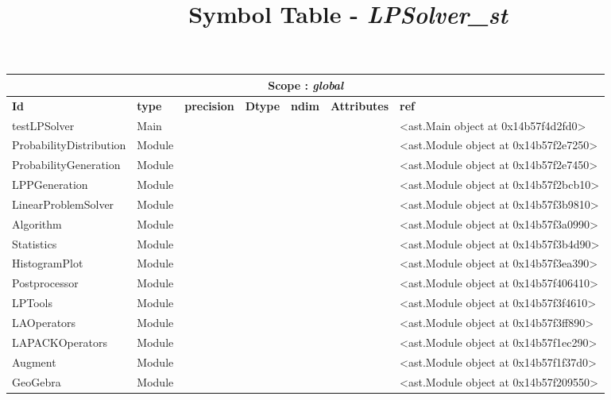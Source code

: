 \documentclass{report}
\title{\bfseries Symbol Table - \textit{LPSolver\_st}}
\begin{document}
\maketitle\pagebreak

\renewcommand{\arraystretch}{1.5}
\addtolength{\textwidth}{3cm}


\begin{center}
\begin{longtable}{|p{3.5cm}|p{1.5cm}|p{1.5cm}|p{1.5cm}|p{1cm}|p{2cm}|p{4cm}| }
\hline
\multicolumn{7}{|c|}{\textbf{Scope : }  \textbf{\textit{global}}} \\ 
\hline
\textbf{Id} & \textbf{type} & \textbf{precision} & \textbf{Dtype} & \textbf{ndim} & \textbf{Attributes} & \textbf{ref} \\\hline

testLPSolver & Main &  &  &  &  & <ast.Main object at 0x14b57f4d2fd0> \\\hline

ProbabilityDistribution & Module &  &  &  &  & <ast.Module object at 0x14b57f2e7250> \\\hline

ProbabilityGeneration & Module &  &  &  &  & <ast.Module object at 0x14b57f2e7450> \\\hline

LPPGeneration & Module &  &  &  &  & <ast.Module object at 0x14b57f2bcb10> \\\hline

LinearProblemSolver & Module &  &  &  &  & <ast.Module object at 0x14b57f3b9810> \\\hline

Algorithm & Module &  &  &  &  & <ast.Module object at 0x14b57f3a0990> \\\hline

Statistics & Module &  &  &  &  & <ast.Module object at 0x14b57f3b4d90> \\\hline

HistogramPlot & Module &  &  &  &  & <ast.Module object at 0x14b57f3ea390> \\\hline

Postprocessor & Module &  &  &  &  & <ast.Module object at 0x14b57f406410> \\\hline

LPTools & Module &  &  &  &  & <ast.Module object at 0x14b57f3f4610> \\\hline

LAOperators & Module &  &  &  &  & <ast.Module object at 0x14b57f3ff890> \\\hline

LAPACKOperators & Module &  &  &  &  & <ast.Module object at 0x14b57f1ec290> \\\hline

Augment & Module &  &  &  &  & <ast.Module object at 0x14b57f1f37d0> \\\hline

GeoGebra & Module &  &  &  &  & <ast.Module object at 0x14b57f209550> \\\hline

\end{longtable}
\end{center}
\end{document}
